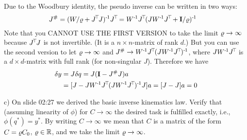 \begin{solution}
Due to the Woodbury identity, the pseudo inverse can be written in two
ways:
\begin{align}
J^\#
 &= (W/\r + J^\T J)^\1 J^\T 
  = W^\1 J^\T (J W^\1 J^\T + \Id/\r)^\1
\end{align}
Note that you CANNOT USE THE FIRST VERSION to take the limit
$\varrho\to\infty$ because $J^{\!\top\!} J$ is not invertible. (It is a $n\times
n$-matrix of rank $d$.) But you can use the second version to let
$\varrho\to\infty$ and $J^\# \to W^{{\hspace*{-.0pt}\text{\rm -}\hspace*{-.5pt}}1} J^{\!\top\!} (J W^{{\hspace*{-.0pt}\text{\rm -}\hspace*{-.5pt}}1} J^{\!\top\!})^{{\hspace*{-.0pt}\text{\rm -}\hspace*{-.5pt}}1}$, where $J W^{{\hspace*{-.0pt}\text{\rm -}\hspace*{-.5pt}}1}
J^{\!\top\!}$ is a $d\times d$-matrix with full rank (for non-singular
$J$). Therefore we have
\begin{align}
\delta y
&= J \delta q
 = J ({\rm\bf I} - J^\# J) a \\
&= [J - J  W^{{\hspace*{-.0pt}\text{\rm -}\hspace*{-.5pt}}1} J^{\!\top\!} (J W^{{\hspace*{-.0pt}\text{\rm -}\hspace*{-.5pt}}1} J^{\!\top\!})^{{\hspace*{-.0pt}\text{\rm -}\hspace*{-.5pt}}1} J] a = [J-J]a = 0
\end{align}
\end{solution}

c) On slide 02:27 we derived the basic inverse kinematics law. Verify
that (assuming linearity of $\phi$) for $C\to\infty$ the desired task
is fulfilled exactly, i.e., $\phi(q^*) = y^*$. By writing $C\to\infty$
we mean that $C$ is a matrix of the form $C=\varrho C_0$, $\varrho\in{\mathbb{R}}$, and
we take the limit $\varrho\to\infty$.






